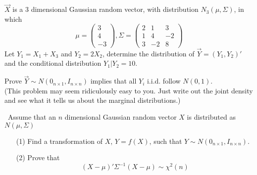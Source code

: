 \documentclass[12pt]{article}
\begin{document}
 {
$\vec{X}$ is a 3 dimensional Gaussian random vector, with distribution $N_3(\mu, \Sigma)$, in which
\[\mu=\begin{pmatrix} 3\\4\\-3\end{pmatrix}, \Sigma=\begin{pmatrix} 2&1&3\\1&4&-2\\3&-2&8\end{pmatrix}\]
Let $Y_1=X_1+X_3$ and $Y_2=2X_2$, determine the distribution of $\vec{Y}=(Y_1,Y_2)'$ and the conditional distribution $Y_1|Y_2=10$.
} { \vfill
  \answer
} { }


 {
Prove $\vec{Y}\sim N(0_{n\times1}, I_{n\times n})$ implies that all $Y_i$ i.i.d. follow $N(0,1)$. \\
(This problem may seem ridiculously easy to you. Just write out the joint density and see what it tells us about the marginal distributions.)
} { \vfill
  \answer
} { }


 {\
Assume that an $n$ dimensional Gaussian random vector $X$ is distributed as $N(\mu,\Sigma)$
\begin{enumerate}
\item[(1)] Find a transformation of $X$, $Y=f(X)$, such that $Y\sim N(0_{n\times 1}, I_{n\times n})$.
\item[(2)] Prove that 
\[(X-\mu)'\Sigma^{-1}(X-\mu)\sim \chi^2(n)\]
\end{enumerate}
} { \vfill
  \answer
} { }



\problemsdone
\end{document}
